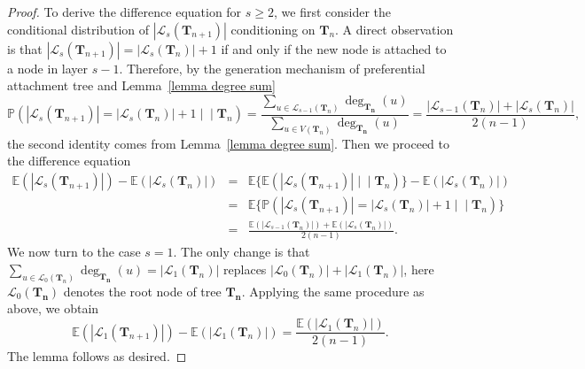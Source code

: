 \documentclass[twoside,11pt]{article}
\theoremstyle{remark}
\begin{document}
\begin{proof}
To derive the difference equation for $s\geq 2$, we first consider the conditional distribution of $\left|\mathcal{L}_s\left(\boldsymbol{T}_{n+1}\right)\right|$ conditioning on $\boldsymbol{T}_n$. 
A direct observation is that $\left|\mathcal{L}_s\left(\boldsymbol{T}_{n+1}\right)\right|=\left|\mathcal{L}_s\left(\boldsymbol{T}_{n}\right)\right|+1$ if and only if the new node is attached to a node in layer $s-1$. 
Therefore, by the generation mechanism of preferential attachment tree and Lemma~\ref{lemma degree sum}
%
\begin{equation*}
\mathbb{P}\left(\left|\mathcal{L}_{s}\left(\boldsymbol{T}_{n+1}\right)\right|=\left|\mathcal{L}_{s}\left(\boldsymbol{T}_{n}\right)\right|+1 \mid\!\!\mid \boldsymbol{T}_n\right)=\frac{\sum_{u\in \mathcal{L}_{s-1}\left(\boldsymbol{T}_{n}\right)}\operatorname{deg}_{\boldsymbol{T_n}}\left(u\right)}{\sum_{u\in V\left(\boldsymbol{T}_{n}\right)}\operatorname{deg}_{\boldsymbol{T_n}}\left(u\right)}=\frac{\left|\mathcal{L}_{s-1}\left(\boldsymbol{T}_{n}\right)\right|+\left|\mathcal{L}_{s}\left(\boldsymbol{T}_{n}\right)\right|}{2\left(n-1\right)},
\end{equation*}
%
the second identity comes from Lemma~\ref{lemma degree sum}.
Then we proceed to the difference equation
%
\begin{eqnarray*}
\mathbb{E}\left(\left|\mathcal{L}_s\left(\boldsymbol{T}_{n+1}\right)\right|\right)-\mathbb{E}\left(\left|\mathcal{L}_s\left(\boldsymbol{T}_n\right)\right|\right)
&=&
\mathbb{E}\bigl\{\mathbb{E}(|\mathcal{L}_s(\boldsymbol{T}_{n+1})| \mid\!\!\mid \boldsymbol{T}_n ) \bigr\}-\mathbb{E}\left(\left|\mathcal{L}_s\left(\boldsymbol{T}_n\right)\right|\right)\\
&=& \mathbb{E} \bigl\{ \mathbb{P}\left(\left|\mathcal{L}_s\left(\boldsymbol{T}_{n+1}\right)\right|=\left|\mathcal{L}_s\left(\boldsymbol{T}_{n}\right)\right|+1 \mid\!\!\mid \boldsymbol{T}_n\right) \bigr\}\\
%
&=&\frac{\mathbb{E}\left(\left|\mathcal{L}_{s-1}\left(\boldsymbol{T}_n\right)\right|\right)+\mathbb{E}\left(\left|\mathcal{L}_s\left(\boldsymbol{T}_n\right)\right|\right)}{2 \left(n-1\right)}.   
\end{eqnarray*}
%
We now turn to the case $s=1$. The only change is that $\sum_{u\in \mathcal{L}_{0}\left(\boldsymbol{T}_{n}\right)}\operatorname{deg}_{\boldsymbol{T_n}}\left(u\right)=\left|\mathcal{L}_{1}\left(\boldsymbol{T}_{n}\right)\right|$ replaces $\left|\mathcal{L}_{0}\left(\boldsymbol{T}_{n}\right)\right|+\left|\mathcal{L}_{1}\left(\boldsymbol{T}_{n}\right)\right|$, here $\mathcal{L}_0(\bm{T_n})$ denotes the root node of tree $\bm{T_n}$.
Applying the same procedure as above, we obtain
%
\begin{equation*}
\mathbb{E}\left(\left|\mathcal{L}_1\left(\boldsymbol{T}_{n+1}\right)\right|\right)-\mathbb{E}\left(\left|\mathcal{L}_1\left(\boldsymbol{T}_n\right)\right|\right)=\frac{\mathbb{E}\left(\left|\mathcal{L}_1\left(\boldsymbol{T}_n\right)\right|\right)}{2 \left(n-1\right)}.
\end{equation*}
%
The lemma follows as desired.
\end{proof}
\end{document}
